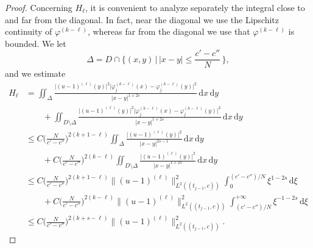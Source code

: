 \documentclass{article}
\theoremstyle{definition}
\newcommand{\abs}[1]{\left|#1\right|}
\newcommand{\de}{\mathrm{d}}
\let\phi\varphi
\let\l\ell
\begin{document}
\begin{proof}
Concerning $H_\l$, it is convenient to analyze separately the integral close to and far from the diagonal. In fact, near the diagonal we use the Lipschitz continuity of $\phi^{(k-\l)}$, whereas far from the diagonal we use that $\phi^{(k-\l)}$ is bounded. We let
\begin{equation*}
    \Delta=D\cap \Big\{(x,y)\,\Big|\, |x-y|\leq \frac{c'-c''}{N} \,\Big\},
\end{equation*} 
and we estimate
\begin{equation*}
    \begin{split}
       H_\l & = \iint_{\Delta}\frac{  \big|(u-1)^{(\l)}(y)\big|^2\big|\phi_j^{(k-\l)}(x)-\phi_j^{(k-\l)}(y) \big|^2}{|x-y|^{1+2s}} \,\de x\,\de y\\
         &\qquad+ \iint_{D\setminus\Delta}\frac{  \big|(u-1)^{(\l)}(y)\big|^2\big|\phi_j^{(k-\l)}(x)-\phi_j^{(k-\l)}(y) \big|^2}{|x-y|^{1+2s}} \,\de x\,\de y\\
         & \leq C \bigg(\frac{N}{c'-c''}\bigg)^{2(k+1-\l)}  \iint_{\Delta}\frac{  \big| (u-1)^{(\l)}(y)\big|^2 }{|x-y|^{2s-1}} \,\de x\,\de y\\
         & \qquad +C \bigg(\frac{N}{c'-c''}\bigg)^{2(k-\l)} \iint_{D\setminus\Delta}   \frac{\big| (u-1)^{(\l)}(y)\big |^2}{\abs{x-y}^{1+2s}} \,\de x\,\de y\\
                  & \leq C  \bigg(\frac{N}{c'-c''}\bigg)^{2(k+1-\l)}  \big\|(u-1)^{(\l)}\big \|^2_{L^2((t_{j-1},c))} \int_{0}^{(c'-c'')/N}\xi^{1-2s} \,\de \xi\\
         & \qquad +C \bigg(\frac{N}{c'-c''}\bigg)^{2(k-\l)}    \big\|(u-1)^{(\l)}\big \|^2_{L^2((t_{j-1},c))}  \int_{(c'-c'')/N}^{+\infty}\xi^{-1-2s} \,\de \xi\\
                 & \leq C \bigg(\frac{N}{c'-c''}\bigg)^{2(k+s-\l)}  \big\|(u-1)^{(\l)}\big \|^2_{L^2((t_{j-1},c))}.
    \end{split}
\end{equation*}


\end{proof}
\end{document}
